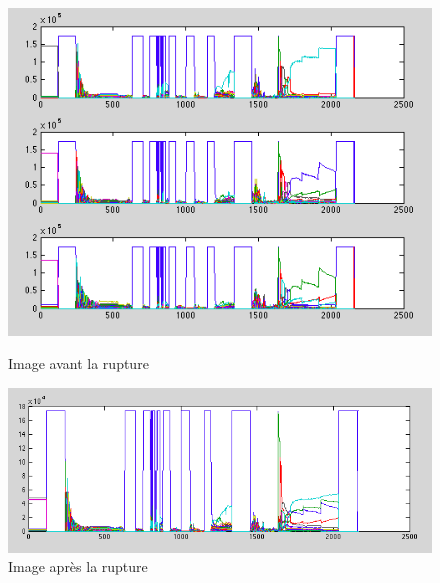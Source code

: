 \begin{figure}[h!]
   \begin{minipage}[c]{.46\linewidth}
	  \centering
      \includegraphics[scale=0.4]{images/diagRGB.png}
      \caption{\label{Avant} Image avant la rupture}
   \end{minipage} \hfill
   \begin{minipage}[c]{.46\linewidth}
      \centering
      \includegraphics[scale=0.35]{images/diagGris.png}
      \caption{\label{Après} Image après la rupture}
   \end{minipage}
\end{figure}